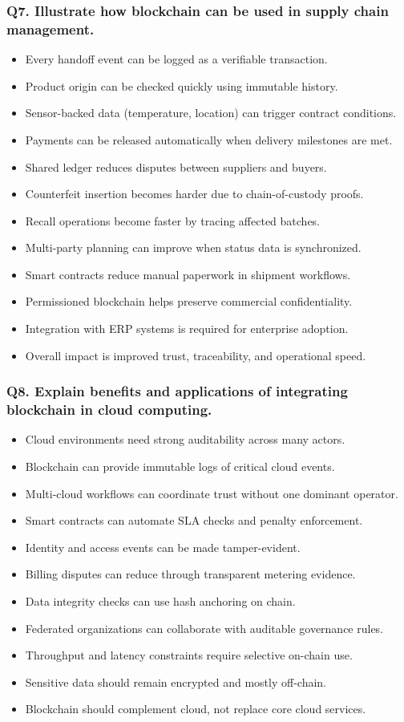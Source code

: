 \documentclass[12pt,a4paper]{article}
\begin{document}
\subsubsection*{Q7. Illustrate how blockchain can be used in supply chain management.}
\begin{itemize}
\item Every handoff event can be logged as a verifiable transaction.
\item Product origin can be checked quickly using immutable history.
\item Sensor-backed data (temperature, location) can trigger contract conditions.
\item Payments can be released automatically when delivery milestones are met.
\item Shared ledger reduces disputes between suppliers and buyers.
\item Counterfeit insertion becomes harder due to chain-of-custody proofs.
\item Recall operations become faster by tracing affected batches.
\item Multi-party planning can improve when status data is synchronized.
\item Smart contracts reduce manual paperwork in shipment workflows.
\item Permissioned blockchain helps preserve commercial confidentiality.
\item Integration with ERP systems is required for enterprise adoption.
\item Overall impact is improved trust, traceability, and operational speed.
\end{itemize}

\subsubsection*{Q8. Explain benefits and applications of integrating blockchain in cloud computing.}
\begin{itemize}
\item Cloud environments need strong auditability across many actors.
\item Blockchain can provide immutable logs of critical cloud events.
\item Multi-cloud workflows can coordinate trust without one dominant operator.
\item Smart contracts can automate SLA checks and penalty enforcement.
\item Identity and access events can be made tamper-evident.
\item Billing disputes can reduce through transparent metering evidence.
\item Data integrity checks can use hash anchoring on chain.
\item Federated organizations can collaborate with auditable governance rules.
\item Throughput and latency constraints require selective on-chain use.
\item Sensitive data should remain encrypted and mostly off-chain.
\item Blockchain should complement cloud, not replace core cloud services.
\end{itemize}
\end{document}

